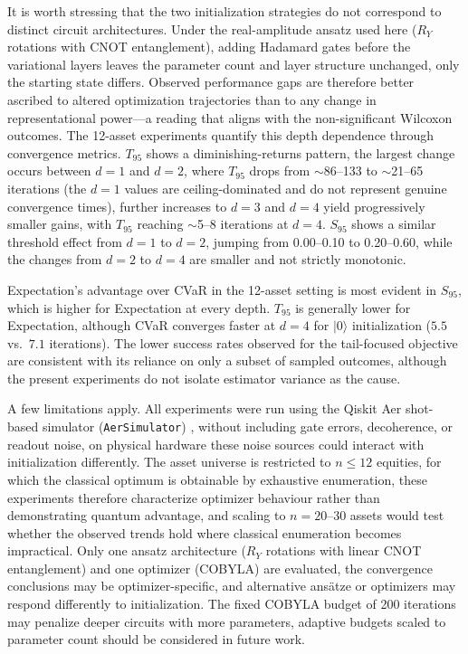 \documentclass[runningheads]{llncs}
\begin{document}
It is worth stressing that the two initialization strategies do not correspond to distinct circuit architectures. Under the real-amplitude ansatz used here ($R_Y$ rotations with CNOT entanglement), adding Hadamard gates before the variational layers leaves the parameter count and layer structure unchanged, only the starting state differs. Observed performance gaps are therefore better ascribed to altered optimization trajectories than to any change in representational power---a reading that aligns with the non-significant Wilcoxon outcomes.
The 12-asset experiments quantify this depth dependence through convergence metrics. $T_{95}$ shows a diminishing-returns pattern, the largest change occurs between $d = 1$ and $d = 2$, where $T_{95}$ drops from $\sim$86--133 to $\sim$21--65 iterations (the $d = 1$ values are ceiling-dominated and do not represent genuine convergence times), further increases to $d = 3$ and $d = 4$ yield progressively smaller gains, with $T_{95}$ reaching $\sim$5--8 iterations at $d = 4$. $S_{95}$ shows a similar threshold effect from $d = 1$ to $d = 2$, jumping from 0.00--0.10 to 0.20--0.60, while the changes from $d = 2$ to $d = 4$ are smaller and not strictly monotonic.

Expectation's advantage over CVaR in the 12-asset setting is most evident in $S_{95}$, which is higher for Expectation at every depth. $T_{95}$ is generally lower for Expectation, although CVaR converges faster at $d=4$ for $|0\rangle$ initialization ($5.5$ vs.\ $7.1$ iterations). The lower success rates observed for the tail-focused objective are consistent with its reliance on only a subset of sampled outcomes, although the present experiments do not isolate estimator variance as the cause.

A few limitations apply. All experiments were run using the Qiskit Aer shot-based simulator (\texttt{AerSimulator}) \cite{qiskitAer}, without including gate errors, decoherence, or readout noise, on physical hardware these noise sources could interact with initialization differently. The asset universe is restricted to $n \leq 12$ equities, for which the classical optimum is obtainable by exhaustive enumeration, these experiments therefore characterize optimizer behaviour rather than demonstrating quantum advantage, and scaling to $n = 20$--$30$ assets would test whether the observed trends hold where classical enumeration becomes impractical. Only one ansatz architecture ($R_Y$ rotations with linear CNOT entanglement) and one optimizer (COBYLA) are evaluated, the convergence conclusions may be optimizer-specific, and alternative ans\"atze or optimizers may respond differently to initialization. The fixed COBYLA budget of 200 iterations may penalize deeper circuits with more parameters, adaptive budgets scaled to parameter count should be considered in future work.
\end{document}
